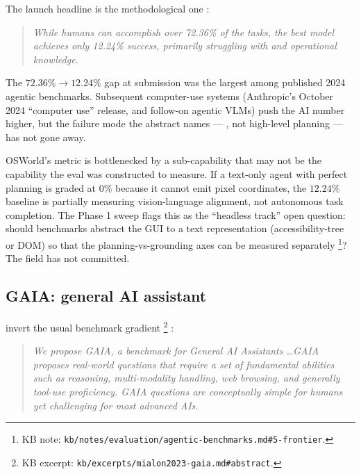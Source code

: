 The launch headline is the methodological one
\citep[\S{}abstract]{xie2024-osworld}:

\begin{quote}\itshape
While humans can accomplish over 72.36\% of the tasks, the best model
achieves only 12.24\% success, primarily struggling with 
and operational knowledge.
\end{quote}

The $72.36\% \to 12.24\%$ gap at submission was the largest among
published 2024 agentic benchmarks. Subsequent computer-use systems
(Anthropic's October 2024 ``computer use''  release, and
follow-on agentic VLMs) push the AI number higher, but the failure
mode the abstract names --- , not high-level planning
--- has not gone away.

\begin{contradiction}
OSWorld's metric is bottlenecked by a sub-capability that may not be
the capability the eval was constructed to measure. If a text-only
agent with perfect planning is graded at $0\%$ because it cannot
emit pixel coordinates, the $12.24\%$ baseline is partially measuring
vision-language alignment, not autonomous task completion. The Phase
1 sweep flags this as the ``headless track'' open question: should
benchmarks abstract the GUI to a text representation
(accessibility-tree or DOM) so that the planning-vs-grounding axes
can be measured separately%
\footnote{KB note: \texttt{kb/notes/evaluation/agentic-benchmarks.md\#5-frontier}.}?
The field has not committed.
\end{contradiction}

\subsection{GAIA: general AI assistant}
\label{sec:agentic-gaia}

\citet{mialon2023-gaia} invert the usual benchmark gradient%
\footnote{KB excerpt: \texttt{kb/excerpts/mialon2023-gaia.md\#abstract}.}
\citep[\S{}abstract]{mialon2023-gaia}:

\begin{quote}\itshape
We propose GAIA, a benchmark for General AI Assistants \ldots GAIA
proposes real-world questions that require a set of fundamental
abilities such as reasoning, multi-modality handling, web browsing,
and generally tool-use proficiency. GAIA questions are conceptually
simple for humans yet challenging for most advanced AIs.
\end{quote}

